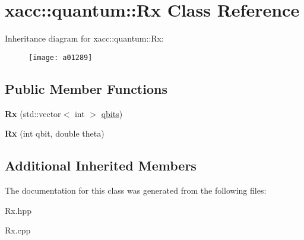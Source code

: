 \hypertarget{a01289}{}\section{xacc\+:\+:quantum\+:\+:Rx Class Reference}
\label{a01289}
Inheritance diagram for xacc\+:\+:quantum\+:\+:Rx\+:\begin{figure}[H]
\begin{center}
\leavevmode
\texttt{[image: a01289]}
\end{center}
\end{figure}
\subsection*{Public Member Functions}
\begin{DoxyCompactItemize}
\item 
\mbox{\label{a01289_a03babfe938a6cbf7f744fcd31a52d92d}} 
{\bfseries Rx} (std\+::vector$<$ int $>$ \hyperlink{a01253_a2a56be6c2519ea65df4d06f4abae1393}{qbits})
\item 
\mbox{\label{a01289_a01667b11d34d5621b98ebff9a07d9bbf}} 
{\bfseries Rx} (int qbit, double theta)
\end{DoxyCompactItemize}
\subsection*{Additional Inherited Members}


The documentation for this class was generated from the following files\+:\begin{DoxyCompactItemize}
\item 
Rx.\+hpp\item 
Rx.\+cpp\end{DoxyCompactItemize}
